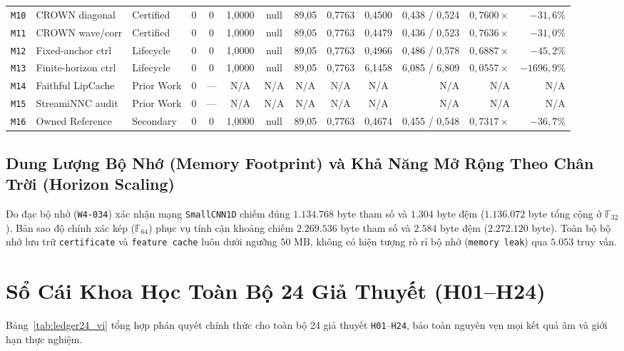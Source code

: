 \documentclass[11pt,a4paper]{article}
\newcommand{\F}{\mathbb{F}}
\newcommand{\code}[1]{{\small\ttfamily\nolinkurl{#1}}}
\theoremstyle{remark}
\begin{document}
\begin{table}[!htbp]
{\begin{tabular}{@{}lllrccccccrrr@{}}
\code{M10} & CROWN diagonal & Certified & 0 & 0 & 1,0000 & null & 89,05 & 0,7763 & 0,4500 & 0,438 / 0,524 & $0,7600\times$ & $-31,6\%$ \\
\code{M11} & CROWN wave/corr & Certified & 0 & 0 & 1,0000 & null & 89,05 & 0,7763 & 0,4479 & 0,436 / 0,523 & $0,7636\times$ & $-31,0\%$ \\
\code{M12} & Fixed-anchor ctrl & Lifecycle & 0 & 0 & 1,0000 & null & 89,05 & 0,7763 & 0,4966 & 0,486 / 0,578 & $0,6887\times$ & $-45,2\%$ \\
\code{M13} & Finite-horizon ctrl & Lifecycle & 0 & 0 & 1,0000 & null & 89,05 & 0,7763 & 6,1458 & 6,085 / 6,809 & $0,0557\times$ & $-1696,9\%$ \\
\code{M14} & Faithful LipCache & Prior Work & 0 & --- & N/A & N/A & N/A & N/A & N/A & N/A & N/A & N/A \\
\code{M15} & StreamiNNC audit & Prior Work & 0 & --- & N/A & N/A & N/A & N/A & N/A & N/A & N/A & N/A \\
\code{M16} & Owned Reference & Secondary & 0 & 0 & 1,0000 & null & 89,05 & 0,7763 & 0,4674 & 0,455 / 0,548 & $0,7317\times$ & $-36,7\%$ \\
\bottomrule
\end{tabular}%
}
\end{table}

\subsection{Dung Lượng Bộ Nhớ (Memory Footprint) và Khả Năng Mở Rộng Theo Chân Trời (Horizon Scaling)}
Đo đạc bộ nhớ (\code{W4-034}) xác nhận mạng \code{SmallCNN1D} chiếm đúng $1.134.768$ byte tham số và $1.304$ byte đệm ($1.136.072$ byte tổng cộng ở $\F_{32}$). Bản sao độ chính xác kép ($\F_{64}$) phục vụ tính cận khoảng chiếm $2.269.536$ byte tham số và $2.584$ byte đệm ($2.272.120$ byte). Toàn bộ bộ nhớ lưu trữ \code{certificate} và \code{feature cache} luôn dưới ngưỡng $50\text{ MB}$, không có hiện tượng rò rỉ bộ nhớ (\code{memory leak}) qua $5.053$ truy vấn.

\section{Sổ Cái Khoa Học Toàn Bộ 24 Giả Thuyết (H01--H24)}

Bảng~\ref{tab:ledger24_vi} tổng hợp phán quyết chính thức cho toàn bộ 24 giả thuyết \code{H01}--\code{H24}, bảo toàn nguyên vẹn mọi kết quả âm và giới hạn thực nghiệm.
\end{document}
